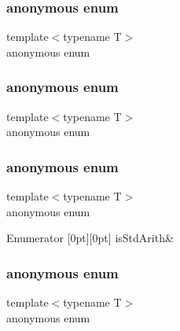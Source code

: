 \mbox{\label{classUtil_1_1TypeTraits_ab36b0074c25b9624a563fb80ba54d324}} 
\subsubsection{\texorpdfstring{anonymous enum}{anonymous enum}}
{\footnotesize\ttfamily template$<$typename T$>$ \\
anonymous enum}

\mbox{\label{classUtil_1_1TypeTraits_aee28a16b3a628c8e10b95f6827ff77c7}} 
\subsubsection{\texorpdfstring{anonymous enum}{anonymous enum}}
{\footnotesize\ttfamily template$<$typename T$>$ \\
anonymous enum}

\mbox{\label{classUtil_1_1TypeTraits_ac7d66b692de66a220c7988bb3aaffa3f}} 
\subsubsection{\texorpdfstring{anonymous enum}{anonymous enum}}
{\footnotesize\ttfamily template$<$typename T$>$ \\
anonymous enum}

\begin{DoxyEnumFields}{Enumerator}
[0pt][0pt]{}\mbox{\label{classUtil_1_1TypeTraits_abfcd1f4b7a5011b6ea8b965d1b46e54ea3017f19abc6084d7e144891aaf5adb0f}} 
is\+Std\+Arith&\\
\hline

\end{DoxyEnumFields}
\mbox{\label{classUtil_1_1TypeTraits_ab933ddaedc99d5b5402782ebc701cd94}} 
\subsubsection{\texorpdfstring{anonymous enum}{anonymous enum}}
{\footnotesize\ttfamily template$<$typename T$>$ \\
anonymous enum}

